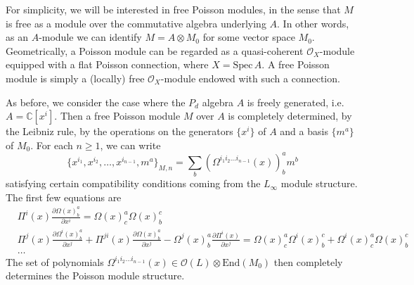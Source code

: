 \documentclass[11pt]{article}
\newcommand{\C}{\mathbb{C}}
\numberwithin{equation}{section}
\begin{document}
For simplicity, we will be interested in free Poisson modules, in the sense that $M$ is free as a module over the commutative algebra underlying $A$. In other words, as an $A$-module we can identify $M = A\otimes M_0$ for some vector space $M_0$. Geometrically, a Poisson module can be regarded as a quasi-coherent $\mathcal{O}_X$-module equipped with a flat Poisson connection, where $X = \mathrm{Spec}\,A$. A free Poisson module is simply a (locally) free $\mathcal{O}_X$-module endowed with such a connection.

As before, we consider the case where the $P_d$ algebra $A$ is freely generated, i.e. $A = \C[x^i]$. Then a free Poisson module $M$ over $A$ is completely determined, by the Leibniz rule, by the operations on the generators $\{x^i\}$ of $A$ and a basis $\{m^a\}$ of $M_0$. For each $n\geq 1$, we can write
\begin{equation}
	\{x^{i_1},x^{i_2},\dots,x^{i_{n-1}},m^a\}_{M,n} = \sum_{b} (\Omega^{i_1i_2\dots i_{n-1}}(x))^{a}_bm^b
\end{equation}
satisfying certain compatibility conditions coming from the $L_\infty$ module structure. The first few equations are
\begin{equation}\label{eq:pmod_jac}
	\begin{aligned}
		&\Pi^i(x)\frac{\partial \Omega(x)^{a}_b}{\partial x^i} =  \Omega(x)^a_c\Omega(x)^{c}_b\\
		&\Pi^j(x)\frac{\partial \Omega^i(x)^{a}_b}{\partial x^j}
		+\Pi^{ji}(x)\frac{\partial \Omega(x)^{a}_b}{\partial x^j}
		-\Omega^j(x)^{a}_b\frac{\partial \Pi^i(x)}{\partial x^j}
		= \Omega(x)^a_c\Omega^i(x)^c_b+\Omega^i(x)^a_c\Omega(x)^c_b\\
		&\dots
	\end{aligned}
\end{equation}
The set of polynomials $\Omega^{i_1i_2\dots i_{n-1}}(x) \in \mathcal{O}(L)\otimes \mathrm{End}(M_0)$ then completely determines the Poisson module structure.
\end{document}
